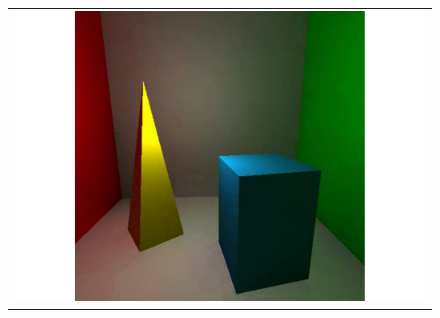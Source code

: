 \begin{figure}
\begin{center}
{\begin{tabular}{c}
\includegraphics*[scale=0.2]{imgs/pq_frame7.pdf}
\end{tabular}
}%
\end{center}
\end{figure}
